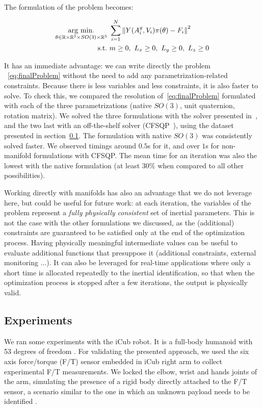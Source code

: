 The formulation of the problem becomes:

\begin{equation}
\begin{aligned}
\label{eq:finalProblem}
    \operatorname*{arg\ min.}_{\theta \in \mathbb{R}\times\mathbb{R}^3\times SO(3) \times \mathbb{R}^3} &\ \sum_{i = 1}^N \left\| Y(A^g_i, V_i) \pi(\theta) - F_i \right\|^2 \\
    \mbox{s.t.} &\ m \geq 0,\ L_x \geq 0,\ L_y \geq 0,\ L_z \geq 0
\end{aligned}
\end{equation}

It has an immediate advantage: we can write directly the problem ~\eqref{eq:finalProblem} without the need to add any parametrization-related constraints.
Because there is less variables and less constraints, it is also faster to solve.
To check this, we compared the resolution of~\eqref{eq:finalProblem} formulated with each of the three parametrizations (native $SO(3)$, unit quaternion, rotation matrix).
We solved the three formulations with the solver presented in~\cite{brossette:Humanoids:2015}, and the two last with an off-the-shelf solver (CFSQP~\cite{cfsqp:manual}), using the dataset presented in section~\ref{sub:experiments}.
The formulation with native $SO(3)$ was consistently solved faster.
We observed timings around $0.5$s for it, and over $1$s for non-manifold formulations with CFSQP.
The mean time for an iteration was also the lowest with the native formulation (at least $30\%$ when compared to all other possibilities).

Working directly with manifolds has also an advantage that we do not leverage here, but could be useful for future work: at each iteration, the variables of the problem represent a \emph{fully physically consistent} set of inertial parameters.
This is not the case with the other formulations we discussed, as the (additional) constraints are guaranteed to be satisfied only at the end of the optimization process.
Having physically meaningful intermediate values can be useful to evaluate additional functions that presuppose it (additional constraints, external monitoring $\ldots$).
It can also be leveraged for real-time applications where only a short time is allocated repeatedly to the inertial identification, so that when the optimization process is stopped after a few iterations, the output is physically valid.

\subsection{Experiments}
\label{sub:experiments}
We ran some experiments with the iCub robot.
It is a full-body humanoid with 53 degrees of freedom \cite{metta2010icub}.
For validating the presented approach, we used the six axis force/torque (F/T) sensor embedded in iCub right arm to collect experimental F/T measurements.
We locked the elbow, wrist and hands joints of the arm, simulating the presence of a rigid body directly attached to the F/T sensor, a scenario similar to the one in which an unknown payload needs to be identified \cite{kubus2008line}.

